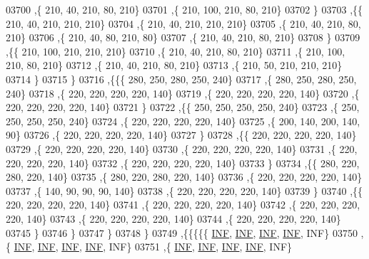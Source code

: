 \begin{DoxyCode}
03700     ,\{   210,    40,   210,    80,   210\}
03701     ,\{   210,   100,   210,    80,   210\}
03702     \}
03703    ,\{\{   210,    40,   210,   210,   210\}
03704     ,\{   210,    40,   210,   210,   210\}
03705     ,\{   210,    40,   210,    80,   210\}
03706     ,\{   210,    40,    80,   210,    80\}
03707     ,\{   210,    40,   210,    80,   210\}
03708     \}
03709    ,\{\{   210,   100,   210,   210,   210\}
03710     ,\{   210,    40,   210,    80,   210\}
03711     ,\{   210,   100,   210,    80,   210\}
03712     ,\{   210,    40,   210,    80,   210\}
03713     ,\{   210,    50,   210,   210,   210\}
03714     \}
03715    \}
03716   ,\{\{\{   280,   250,   280,   250,   240\}
03717     ,\{   280,   250,   280,   250,   240\}
03718     ,\{   220,   220,   220,   220,   140\}
03719     ,\{   220,   220,   220,   220,   140\}
03720     ,\{   220,   220,   220,   220,   140\}
03721     \}
03722    ,\{\{   250,   250,   250,   250,   240\}
03723     ,\{   250,   250,   250,   250,   240\}
03724     ,\{   220,   220,   220,   220,   140\}
03725     ,\{   200,   140,   200,   140,    90\}
03726     ,\{   220,   220,   220,   220,   140\}
03727     \}
03728    ,\{\{   220,   220,   220,   220,   140\}
03729     ,\{   220,   220,   220,   220,   140\}
03730     ,\{   220,   220,   220,   220,   140\}
03731     ,\{   220,   220,   220,   220,   140\}
03732     ,\{   220,   220,   220,   220,   140\}
03733     \}
03734    ,\{\{   280,   220,   280,   220,   140\}
03735     ,\{   280,   220,   280,   220,   140\}
03736     ,\{   220,   220,   220,   220,   140\}
03737     ,\{   140,    90,    90,    90,   140\}
03738     ,\{   220,   220,   220,   220,   140\}
03739     \}
03740    ,\{\{   220,   220,   220,   220,   140\}
03741     ,\{   220,   220,   220,   220,   140\}
03742     ,\{   220,   220,   220,   220,   140\}
03743     ,\{   220,   220,   220,   220,   140\}
03744     ,\{   220,   220,   220,   220,   140\}
03745     \}
03746    \}
03747   \}
03748  \}
03749 ,\{\{\{\{\{   \hyperlink{constants_8h_a12c2040f25d8e3a7b9e1c2024c618cb6}{INF},   \hyperlink{constants_8h_a12c2040f25d8e3a7b9e1c2024c618cb6}{INF},   \hyperlink{constants_8h_a12c2040f25d8e3a7b9e1c2024c618cb6}{INF},   \hyperlink{constants_8h_a12c2040f25d8e3a7b9e1c2024c618cb6}{INF},   INF\}
03750     ,\{   \hyperlink{constants_8h_a12c2040f25d8e3a7b9e1c2024c618cb6}{INF},   \hyperlink{constants_8h_a12c2040f25d8e3a7b9e1c2024c618cb6}{INF},   \hyperlink{constants_8h_a12c2040f25d8e3a7b9e1c2024c618cb6}{INF},   \hyperlink{constants_8h_a12c2040f25d8e3a7b9e1c2024c618cb6}{INF},   INF\}
03751     ,\{   \hyperlink{constants_8h_a12c2040f25d8e3a7b9e1c2024c618cb6}{INF},   \hyperlink{constants_8h_a12c2040f25d8e3a7b9e1c2024c618cb6}{INF},   \hyperlink{constants_8h_a12c2040f25d8e3a7b9e1c2024c618cb6}{INF},   \hyperlink{constants_8h_a12c2040f25d8e3a7b9e1c2024c618cb6}{INF},   INF\}

\end{DoxyCode}
